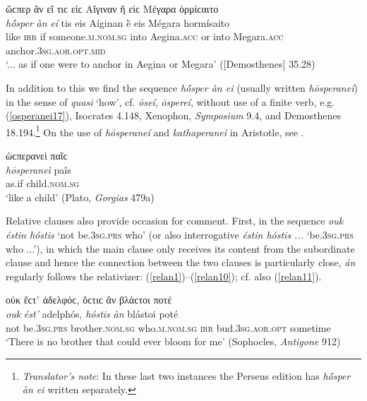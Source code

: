 \begin{exe}
\ex ὥϲπερ ἂν εἴ τιϲ εἰϲ Αἴγιναν ἢ εἰϲ Μέγαρα ὁρμίϲαιτο\\
\gll \emph{hṓsper} \emph{àn} \emph{eí} tis eis Aíginan ḕ eis Mégara hormísaito\\
like \textsc{irr} if someone.\textsc{m.nom.sg} into Aegina.\textsc{acc} or into Megara.\textsc{acc} anchor.\textsc{3sg.aor.opt.mid}\\
\trans `... as if one were to anchor in Aegina or Megara' ({[}Demosthenes{]} 35.28)
\label{osperanei16}
\end{exe}

In addition to this we find the sequence \emph{hṓsper àn ei} (usually written \emph{hōsperaneí}) in the sense of \emph{quasi} `how', cf. \emph{ōseí}, \emph{ōspereí}, without use of a finite verb, e.g. (\ref{osperanei17}), Isocrates 4.148, Xenophon, \textit{Symposium} 9.4, and Demosthenes 18.194.\footnote{\emph{Translator's note}: In these last two instances the Perseus edition has \textit{hṓsper àn ei} written separately.} On the use of \emph{hōsperaneí} and \emph{kathaperaneí} in Aristotle, see \citet[41]{Bonitz1870}.

\begin{exe}
\ex ὡϲπερανεὶ παῖϲ\\
\gll \emph{hōsperaneì} paîs\\
as.if child.\textsc{nom.sg}\\
\trans `like a child' (Plato, \textit{Gorgias} 479a)
\label{osperanei17}
\end{exe}

Relative clauses also provide occasion for comment. First, in the sequence \emph{ouk éstin hóstis} `not be.\textsc{3sg.prs} who' (or also interrogative \emph{éstin hóstis ...} `be.\textsc{3sg.prs} who ...'), in which the main clause only receives its content from the subordinate clause and hence the connection between the two clauses is particularly close, \emph{án} regularly follows the relativizer: (\ref{relan1})--(\ref{relan10}); cf. also (\ref{relan11}).

\begin{exe}
\ex οὐκ ἔϲτ᾽ ἀδελφόϲ, ὅϲτιϲ ἂν βλάϲτοι ποτέ\\
\gll \emph{ouk} \emph{ést'} adelphós, \emph{hóstis} \emph{àn} blástoi poté\\
not be.\textsc{3sg.prs} brother.\textsc{nom.sg} who.\textsc{m.nom.sg}
\textsc{irr} bud.\textsc{3sg.aor.opt} sometime\\
\trans `There is no brother that could ever bloom for me' (Sophocles, \textit{Antigone} 912)
\label{relan1}
\end{exe}

